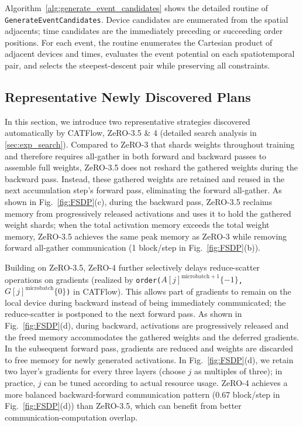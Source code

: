 \documentclass[letterpaper,twocolumn,10pt]{article}
\newcommand{\name}{CATFlow}
\begin{document}
Algorithm~\ref{alg:generate_event_candidates} shows the detailed routine of \texttt{GenerateEventCandidates}. Device candidates are enumerated from the spatial adjacents; time candidates are the immediately preceding or succeeding order positions. For each event, the routine enumerates the Cartesian product of adjacent devices and times, evaluates the event potential on each spatiotemporal pair, and selects the steepest-descent pair while preserving all constraints.

\subsection{Representative Newly Discovered Plans}

In this section, we introduce two representative strategies discovered automatically by \name{}, ZeRO-3.5 \& 4 (detailed search analysis in \cref{sec:exp_search}). Compared to ZeRO-3 that shards weights throughout training and therefore requires all-gather in both forward and backward passes to assemble full weights, ZeRO-3.5 does not reshard the gathered weights during the backward pass. Instead, these gathered weights are retained and reused in the next accumulation step's forward pass, eliminating the forward all-gather. As shown in Fig.~\ref{fig:FSDP}(c), during the backward pass, ZeRO-3.5 reclaims memory from progressively released activations and uses it to hold the gathered weight shards; when the total activation memory exceeds the total weight memory, ZeRO-3.5 achieves the same peak memory as ZeRO-3 while removing forward all-gather communication (1 block/step in Fig.~\ref{fig:FSDP}(b)).

Building on ZeRO-3.5, ZeRO-4 further selectively delays reduce-scatter operations on gradients (realized by \texttt{order($A[j]^{\mathrm{microbatch}+1}\{-1\}$,$G[j]^{\mathrm{microbatch}}\{0\}$)} in \name{}). This allows part of gradients to remain on the local device during backward instead of being immediately communicated; the reduce-scatter is postponed to the next forward pass. As shown in Fig.~\ref{fig:FSDP}(d), during backward, activations are progressively released and the freed memory accommodates the gathered weights and the deferred gradients. In the subsequent forward pass, gradients are reduced and weights are discarded to free memory for newly generated activations. In Fig.~\ref{fig:FSDP}(d), we retain two layer's gradients for every three layers (choose $j$ as multiples of three); in practice, $j$ can be tuned according to actual resource usage. ZeRO-4 achieves a more balanced backward-forward communication pattern (0.67 block/step in Fig.~\ref{fig:FSDP}(d)) than ZeRO-3.5, which can benefit from better communication-computation overlap.
\end{document}
